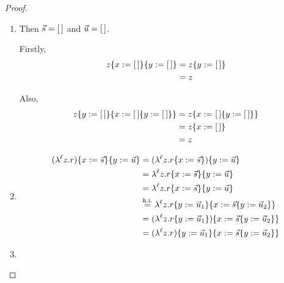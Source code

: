 \begin{proof}
\begin{enumerate}
\item {}
Then $\vec{s} = [\,]$ and $\vec{u} = [\,]$.

Firstly,
\begin{equation*}\begin{split}
  z\{x := [\,]\}\{y := [\,]\}
                   & = z\{y := [\,]\} \\
                   & = z \\
\end{split}\end{equation*}

Also,
\begin{equation*}\begin{split}
  z\{y := [\,]\}\{x := [\,]\{y := [\,]\}\}
                   & = z\{x := [\,]\{y := [\,]\}\} \\
                   & = z\{x := [\,]\} \\
                   & = z \\
\end{split}\end{equation*}

\item {}
\begin{equation*}\begin{split}
  (\lambda^{\ell} z. r)\{x := \vec{s}\}\{y := \vec{u}\}
     & = (\lambda^{\ell} z. r\{x := \vec{s}\})\{y := \vec{u}\} \\
     & = \lambda^{\ell} z. r\{x := \vec{s}\}\{y := \vec{u}\} \\
     & = \lambda^{\ell} z. r\{x := \vec{s}\}\{y := \vec{u}\} \\
     & \overset{\mathrm{h.i.}}{=} \lambda^{\ell} z. r\{y := \vec{u}_1\}\{x := \vec{s}\{y := \vec{u}_2\}\} \\
     & = (\lambda^{\ell} z. r\{y := \vec{u}_1\})\{x := \vec{s}\{y := \vec{u}_2\}\} \\
     & = (\lambda^{\ell} z. r)\{y := \vec{u}_1\}\{x := \vec{s}\{y := \vec{u}_2\}\} \\
\end{split}\end{equation*}
\item {}


\end{enumerate}
\end{proof}
